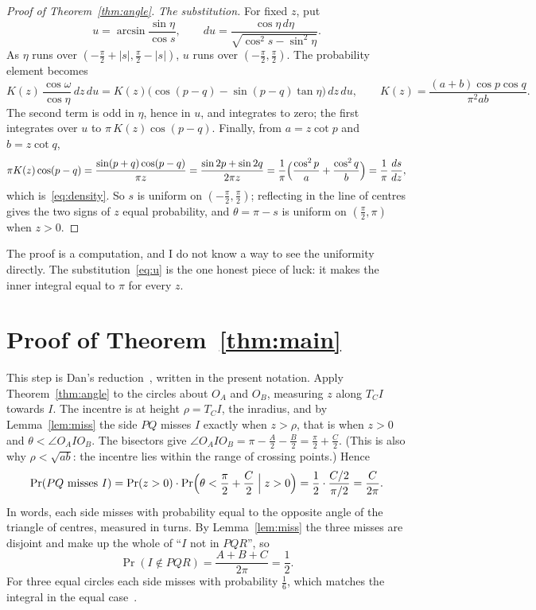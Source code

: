 \documentclass[11pt]{article}
\theoremstyle{remark}
\begin{document}
\begin{proof}[Proof of Theorem~\ref{thm:angle}]
\emph{The substitution.} For fixed $z$, put
\begin{equation}\label{eq:u}
  u=\arcsin\frac{\sin\eta}{\cos s},\qquad
  du=\frac{\cos\eta\,d\eta}{\sqrt{\cos^2s-\sin^2\eta}} .
\end{equation}
As $\eta$ runs over $(-\frac\pi2+|s|,\frac\pi2-|s|)$, $u$ runs over $(-\frac\pi2,\frac\pi2)$. The
probability element becomes
\begin{equation}\label{eq:element}
  K(z)\,\frac{\cos\omega}{\cos\eta}\,dz\,du
  =K(z)\bigl(\cos(p-q)-\sin(p-q)\tan\eta\bigr)\,dz\,du,\qquad
  K(z)=\frac{(a+b)\cos p\cos q}{\pi^2ab}.
\end{equation}
The second term is odd in $\eta$, hence in $u$, and integrates to zero; the first integrates over
$u$ to $\pi\,K(z)\cos(p-q)$. Finally, from $a=z\cot p$ and $b=z\cot q$,
\[
  \pi K(z)\cos(p-q)=\frac{\sin(p+q)\cos(p-q)}{\pi z}=\frac{\sin2p+\sin2q}{2\pi z}
  =\frac1\pi\Bigl(\frac{\cos^2p}{a}+\frac{\cos^2q}{b}\Bigr)=\frac1\pi\,\frac{ds}{dz},
\]
which is~\eqref{eq:density}. So $s$ is uniform on $(-\frac\pi2,\frac\pi2)$; reflecting in the line of
centres gives the two signs of $z$ equal probability, and $\theta=\pi-s$ is uniform on
$(\frac\pi2,\pi)$ when $z>0$.
\end{proof}

The proof is a computation, and I do not know a way to see the uniformity directly. The
substitution~\eqref{eq:u} is the one honest piece of luck: it makes the inner integral equal to $\pi$
for every $z$.

\section{Proof of Theorem~\ref{thm:main}}\label{sec:proofmain}

This step is Dan's reduction~\cite{DanReduction}, written in the present notation. Apply Theorem~\ref{thm:angle} to the circles about $O_A$ and $O_B$, measuring $z$ along $T_CI$
towards $I$. The incentre is at height $\rho=T_CI$, the inradius, and by Lemma~\ref{lem:miss} the side
$PQ$ misses $I$ exactly when $z>\rho$, that is when $z>0$ and $\theta<\angle O_AIO_B$. The bisectors give
$\angle O_AIO_B=\pi-\frac A2-\frac B2=\frac\pi2+\frac C2$. (This is also why $\rho<\sqrt{ab}$: the
incentre lies within the range of crossing points.) Hence
\[
  \Pr(PQ\text{ misses }I)=\Pr(z>0)\cdot\Pr\Bigl(\theta<\frac\pi2+\frac C2\Bigm|z>0\Bigr)
  =\frac12\cdot\frac{C/2}{\pi/2}=\frac{C}{2\pi}.
\]
In words, each side misses with probability equal to the opposite angle of the triangle of centres,
measured in turns. By Lemma~\ref{lem:miss} the three misses are disjoint and make up the whole of
``$I$ not in $PQR$'', so
\[
  \Pr(I\notin PQR)=\frac{A+B+C}{2\pi}=\frac12 .
\]
For three equal circles each side misses with probability $\frac16$, which matches the integral in
the equal case~\cite{DanEqual,user170231}.
\end{document}
